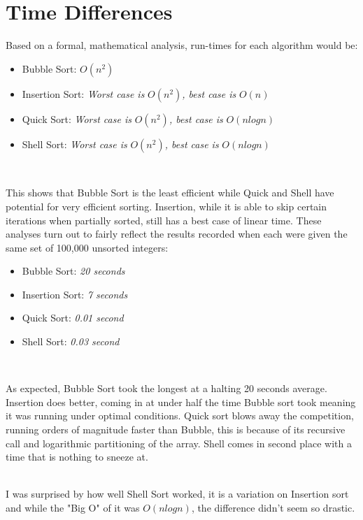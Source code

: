 \documentclass[journal]{IEEEtran}
\begin{document}
\section{Time Differences}
Based on a formal, mathematical analysis, run-times for each algorithm would be:
\begin{itemize}
    \item Bubble Sort: $O(n^2)$
    \item Insertion Sort: \textit{Worst case is }$O(n^2)$\textit{, best case is }$O(n)$
    \item Quick Sort: \textit{Worst case is }$O(n^2)$\textit{, best case is }$O(n logn)$
    \item Shell Sort: \textit{Worst case is }$O(n^2)$\textit{, best case is }$O(n logn)$

\end{itemize}\\ \par
This shows that Bubble Sort is the least efficient while Quick and Shell have potential for very efficient sorting. Insertion, while it is able to skip certain iterations when partially sorted, still has a best case of linear time. These analyses turn out to fairly reflect the results recorded when each were given the same set of 100,000 unsorted integers:
\begin{itemize}
    \item Bubble Sort: \textit{20 seconds}
    \item Insertion Sort: \textit{7 seconds}
    \item Quick Sort: \textit{0.01 second}
    \item Shell Sort: \textit{0.03 second}
\end{itemize}\\ \par
As expected, Bubble Sort took the longest at a halting 20 seconds average. Insertion does better, coming in at under half the time Bubble sort took meaning it was running under optimal conditions. Quick sort blows away the competition, running orders of magnitude faster than Bubble, this is because of its recursive call and logarithmic partitioning of the array. Shell comes in second place with a time that is nothing to sneeze at.\par
\\I was surprised by how well Shell Sort worked, it is a variation on Insertion sort and while the "Big O" of it was $O(n logn)$, the difference didn't seem so drastic.
\\
\\
\\
\\
\\
\\
\end{document}
